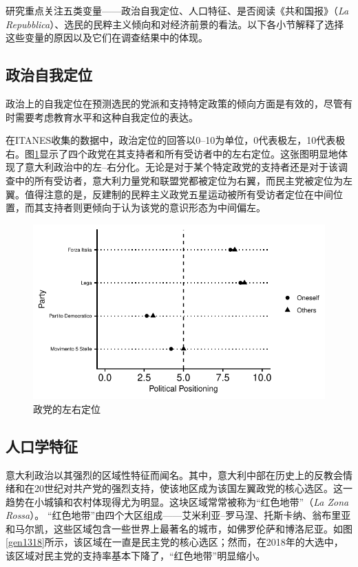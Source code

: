 \documentclass[12pt,a4paper]{ctexart}
\begin{document}
    研究重点关注五类变量——政治自我定位、人口特征、是否阅读《共和国报》（\textit{La Repubblica}）、选民的民粹主义倾向和对经济前景的看法。以下各小节解释了选择这些变量的原因以及它们在调查结果中的体现。

    \subsection{政治自我定位}

    政治上的自我定位在预测选民的党派和支持特定政策的倾向方面是有效的，尽管有时需要考虑教育水平和这种自我定位的表达。
    \cite{coughlin1998grid,lesschaeve2017predictive}
    
    在ITANES收集的数据中，政治定位的回答以0--10为单位，0代表极左，10代表极右。图\ref{positioning}显示了四个政党在其支持者和所有受访者中的左右定位。这张图明显地体现了意大利政治中的左--右分化。无论是对于某个特定政党的支持者还是对于该调查中的所有受访者，意大利力量党和联盟党都被定位为右翼，而民主党被定位为左翼。值得注意的是，反建制的民粹主义政党五星运动被所有受访者定位在中间位置，而其支持者则更倾向于认为该党的意识形态为中间偏左。

    \begin{figure}
        \centering
        \includegraphics[width=1\textwidth]{figure//unnamed-chunk-3-1.pdf}
        \caption{政党的左右定位}
        \label{positioning}
    \end{figure}

    \subsection{人口学特征}

    意大利政治以其强烈的区域性特征而闻名。其中，意大利中部在历史上的反教会情绪和在20世纪对共产党的强烈支持，使该地区成为该国左翼政党的核心选区。这一趋势在小城镇和农村体现得尤为明显。这块区域常常被称为``红色地带''（\textit{La Zona Rossa}）。
    \cite{shin2001whatever}
    ``红色地带''由四个大区组成——艾米利亚--罗马涅、托斯卡纳、翁布里亚和马尔凯，这些区域包含一些世界上最著名的城市，如佛罗伦萨和博洛尼亚。如图\ref{gen1318}所示，该区域在一直是民主党的核心选区；然而，在2018年的大选中，该区域对民主党的支持率基本下降了，``红色地带''明显缩小。
\end{document}
